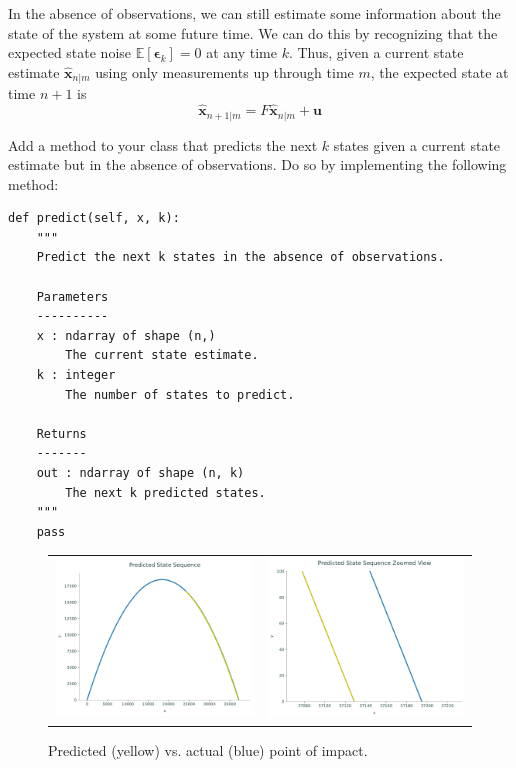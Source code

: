 In the absence of observations, we can still estimate some information about the state of the system at some future time.
We can do this by recognizing that the expected state noise $\mathbb{E}\left[\boldsymbol{\epsilon}_{k}\right] = 0$ at any time $k$.
Thus, given a current state estimate $\widehat{\mathbf{x}}_{n|m}$ using only measurements up through time $m$, the expected state at time $n+1$ is
\begin{equation*}
\widehat{\mathbf{x}}_{n+1|m} = F \widehat{\mathbf{x}}_{n|m} + \mathbf{u}
\end{equation*}

\begin{problem}
Add a method to your class that predicts the next $k$ states given a current state estimate but in the absence of observations.
Do so by implementing the following method:
\begin{lstlisting}
def predict(self, x, k):
    """
    Predict the next k states in the absence of observations.

    Parameters
    ----------
    x : ndarray of shape (n,)
        The current state estimate.
    k : integer
        The number of states to predict.

    Returns
    -------
    out : ndarray of shape (n, k)
        The next k predicted states.
    """
    pass
\end{lstlisting}
\end{problem}

\begin{figure}
    \centering
    \begin{tabular}{cc}
    \includegraphics[width=.45\textwidth]{figures/impact_macro} &
    \includegraphics[width=.45\textwidth]{figures/impact_micro}
    \end{tabular}
    \caption{Predicted (yellow) vs. actual (blue) point of impact.}
    \label{fig:impact}
\end{figure}

